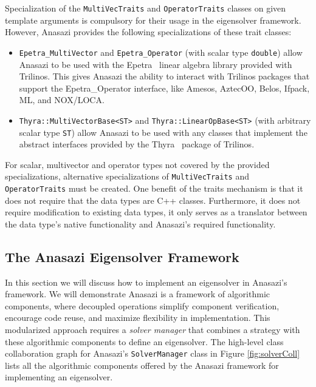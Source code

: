 \documentclass[acmtoms]{acmtrans2m}
\newcounter{algorithm}
\newcommand{\aspace}[1]{\texttt{#1}}
\begin{document}
Specialization of the \aspace{MultiVecTraits} and \aspace{OperatorTraits} classes on
given template arguments is compulsory for their usage in the eigensolver framework.
However, Anasazi provides the following specializations of these trait classes:
\begin{itemize}
  \item \aspace{Epetra\_MultiVector} and \aspace{Epetra\_Operator} (with scalar type
    \aspace{double}) allow Anasazi to be used with the Epetra~\cite{Trilinos:Epetra} linear
    algebra library provided with Trilinos. This gives Anasazi the ability to interact with 
    Trilinos packages that support the Epetra\_Operator interface, like Amesos, AztecOO, Belos, 
    Ifpack, ML, and NOX/LOCA. 
  \item \aspace{Thyra::MultiVectorBase<ST>} and
    \aspace{Thyra::LinearOpBase<ST>} (with arbitrary scalar type
    \aspace{ST}) allow Anasazi to be used with any classes that implement the abstract interfaces
    provided by the Thyra~\cite{Trilinos:Thyra} package of Trilinos.
\end{itemize}
For scalar, multivector and operator types not covered by the provided specializations,
alternative specializations of \aspace{MultiVecTraits} and \aspace{OperatorTraits}
must be created. One benefit of the traits mechanism is that it does
not require that the data types are C++ classes.  Furthermore, it
does not require modification to existing data types, it only serves as a translator between
the data type's native functionality and Anasazi's required functionality. 


\subsection{The Anasazi Eigensolver Framework}
\label{subsec:anasazi:solver_framework}

In this section we will discuss how to implement an eigensolver
in Anasazi's framework.  We will demonstrate Anasazi is 
a framework of algorithmic components, where decoupled operations 
simplify component verification, encourage code reuse, and maximize flexibility
in implementation. This modularized approach requires a \emph{solver manager} that
combines a strategy with these algorithmic components to define an eigensolver.
The high-level class collaboration graph for Anasazi's \aspace{SolverManager} class in 
Figure \ref{fig:solverColl} lists all the algorithmic components offered by the Anasazi
framework for implementing an eigensolver.
\end{document}
